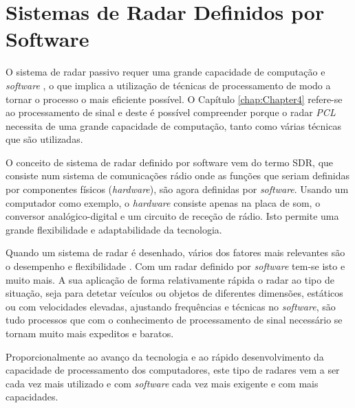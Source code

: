 \section{Sistemas de Radar Definidos por Software}
O sistema de radar passivo requer uma grande capacidade de computação e \textit{software} \parencite{Martorella}, o que implica a utilização de técnicas de processamento de modo a tornar o processo o mais eficiente possível. O Capítulo \ref{chap:Chapter4} refere-se ao processamento de sinal e deste é possível compreender porque o radar \textit{\gls{PCL}} necessita de uma grande capacidade de computação, tanto como várias técnicas que são utilizadas.\par 
O conceito de sistema de radar definido por software vem do termo \gls{SDR}, que consiste num sistema de comunicações rádio onde as funções que seriam definidas por componentes físicos (\textit{hardware}), são agora definidas por \textit{software}. Usando um computador como exemplo, o \textit{hardware} consiste apenas na placa de som, o conversor analógico-digital e um circuito de receção de rádio. Isto permite uma grande flexibilidade e adaptabilidade da tecnologia.\par 
Quando um sistema de radar é desenhado, vários dos fatores mais relevantes são o desempenho e flexibilidade \parencite{Griffiths2017}. Com um radar definido por \textit{software} tem-se isto e muito mais. A sua aplicação de forma relativamente rápida o radar ao tipo de situação, seja para detetar veículos ou objetos de diferentes dimensões, estáticos ou com velocidades elevadas, ajustando frequências e técnicas no \textit{software}, são tudo processos que com o conhecimento de processamento de sinal necessário se tornam muito mais expeditos e baratos.\par 
Proporcionalmente ao avanço da tecnologia e ao rápido desenvolvimento da capacidade de processamento dos computadores, este tipo de radares vem a ser cada vez mais utilizado e com \textit{software} cada vez mais exigente e com mais capacidades.  

